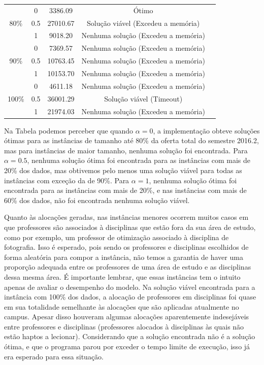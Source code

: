 \begin{table}[h!]
{\begin{tabular}{ccccc}
			\midrule
			\multirow{3}{*}{80\%} &   0 &  3386.09 & Ótimo \\
			                      & 0.5 & 27010.67 & Solução viável (Excedeu a memória)\\
			                      &   1 &  9018.20 & Nenhuma solução (Excedeu a memória)\\
			\midrule
			\multirow{3}{*}{90\%} &   0 &  7369.57 & Nenhuma solução (Excedeu a memória)\\
			                      & 0.5 & 10763.45 & Nenhuma solução (Excedeu a memória)\\
			                      &   1 & 10153.70 & Nenhuma solução (Excedeu a memória)\\
			\midrule
			\multirow{3}{*}{100\%}&   0 &  4611.18 & Nenhuma solução (Excedeu a memória)\\
			                      & 0.5 & 36001.29 & Solução viável (Timeout) \\
			                      &   1 & 21974.03 & Nenhuma solução (Excedeu a memória)\\
			\bottomrule
		\end{tabular}%
	}{
	}
\end{table}

\newpage

Na Tabela  podemos perceber que quando $\alpha = 0$, a implementação obteve soluções ótimas para as instâncias de tamanho até 80\% da oferta total do semestre 2016.2, mas para instâncias de maior tamanho, nenhuma solução foi encontrada. Para $\alpha = 0.5$, nenhuma solução ótima foi encontrada para as instâncias com mais de 20\% dos dados, mas obtivemos pelo menos uma solução viável para todas as instâncias com exceção da de 90\%. Para $\alpha = 1$, nenhuma solução ótima foi encontrada para as instâncias com mais de 20\%, e nas instâncias com mais de 60\% dos dados, não foi encontrada nenhuma solução viável.

Quanto às alocações geradas, nas instâncias menores ocorrem muitos casos em que professores são associados à disciplinas que estão fora da sua área de estudo, como por exemplo, um professor de otimização associado à disciplina de fotografia. Isso é esperado, pois sendo os professores e disciplinas escolhidos de forma aleatória para compor a instância, não temos a garantia de haver uma proporção adequada entre os professores de uma área de estudo e as disciplinas dessa mesma área. É importante lembrar, que essas instâncias tem o intuito apenas de avaliar o desempenho do modelo. Na solução viável encontrada para a instância com 100\% dos dados, a alocação de professores em disciplinas foi quase em sua totalidade semelhante às alocações que são aplicadas atualmente no campus. Apesar disso houveram algumas alocações aparentemente indesejáveis entre professores e disciplinas (professores alocados à disciplinas às quais não estão haptos a lecionar). Considerando que a solução encontrada não é a solução ótima, e que o programa parou por exceder o tempo limite de execução, isso já era esperado para essa situação.

